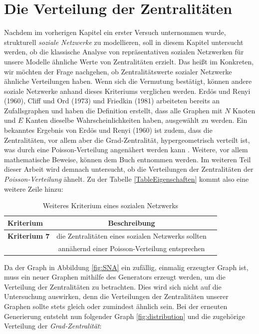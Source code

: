 \section{Die Verteilung der Zentralitäten}
Nachdem im vorherigen Kapitel ein erster Versuch unternommen wurde, strukturell \textit{soziale Netzwerke} zu modellieren, soll in diesem Kapitel untersucht werden, ob die klassische Analyse von repräsentativen sozialen Netzwerken für unsere Modelle ähnliche Werte von Zentralitäten erzielt. Das heißt im Konkreten, wir möchten der Frage nachgehen, ob Zentralitätswerte sozialer Netzwerke ähnliche Verteilungen haben. Wenn sich die Vermutung bestätigt, können andere soziale Netzwerke anhand dieses Kriteriums verglichen werden.
Erdös und Renyi (1960), Cliff und Ord (1973) und Friedkin (1981) arbeiteten bereits an Zufallsgraphen und haben die Definition erstellt, dass alle Graphen mit $N$ Knoten und $E$ Kanten dieselbe Wahrscheinlichkeiten haben, ausgewählt zu werden. Ein bekanntes Ergebnis von Erdös und Renyi (1960) ist zudem, dass die Zentralitäten, vor allem aber die Grad-Zentralität, hypergeometrisch verteilt ist, was durch eine Poisson-Verteilung angenähert werden kann \cite{Distribution}. Weitere, vor allem mathematische Beweise, können dem Buch \cite{Distribution} entnommen werden. Im weiteren Teil dieser Arbeit wird demnach untersucht, ob die Verteilungen der Zentralitäten der \textit{Poisson-Verteilung} ähnelt. Zu der Tabelle \ref{TableEigenschaften} kommt also eine weitere Zeile hinzu:

\begin{table}[h!]
\footnotesize
\caption{Weiteres Kriterium eines sozialen Netzwerks}
\label{TableEigenschaften2.0}
\centering
\begin{tabular}{lcc}\toprule 
\textbf{Kriterium} &\textbf{Beschreibung} 
 &\\\midrule
  \textbf{Kriterium 7} & die Zentralitäten eines sozialen Netzwerks sollten \\ &annähernd einer Poisson-Verteilung entsprechen \cite{verteilung} 
  \\\bottomrule
 \end{tabular}
 \end{table}

Da der Graph in Abbildung \ref{fig:SNA} ein zufällig, einmalig erzeugter Graph ist, muss ein neuer Graphen mithilfe des Generators erzeugt werden, um die Verteilung der Zentralitäten zu betrachten. Dies wird sich nicht auf die Untersuchung auswirken, denn die Verteilungen der Zentralitäten unserer Graphen sollte stets gleich oder zumindest ähnlich sein. Bei der erneuten Generierung entsteht nun folgender Graph \ref{fig:distribution} und die zugehörige Verteilung der \textit{Grad-Zentralität}:

